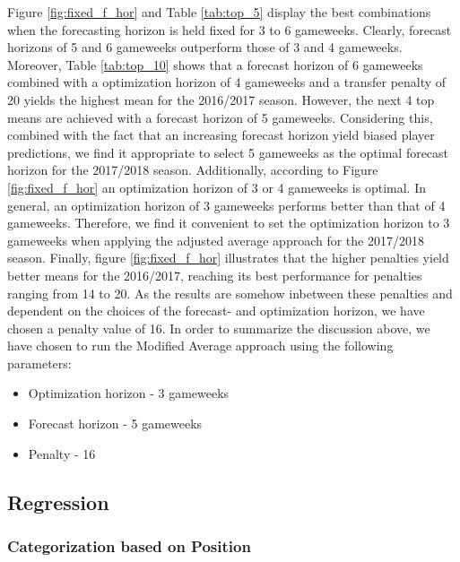 Figure \ref{fig:fixed_f_hor} and Table \ref{tab:top_5} display the best combinations when the forecasting horizon is held fixed for 3 to 6 gameweeks. Clearly, forecast horizons of 5 and 6 gameweeks outperform those of 3 and 4 gameweeks. Moreover, Table \ref{tab:top_10} shows that a forecast horizon of 6 gameweeks combined with a optimization horizon of 4 gameweeks and a transfer penalty of 20 yields the highest mean for the 2016/2017 season. However, the next 4 top means are achieved with a forecast horizon of 5 gameweeks. Considering this, combined with the fact that an increasing forecast horizon yield biased player predictions, we find it appropriate to select 5 gameweeks as the optimal forecast horizon for the 2017/2018 season. Additionally, according to Figure \ref{fig:fixed_f_hor} an optimization horizon of 3 or 4 gameweeks is optimal. In general, an optimization horizon of 3 gameweeks performs better than that of 4 gameweeks. Therefore, we find it convenient to set the optimization horizon to 3 gameweeks when applying the adjusted average approach for the 2017/2018 season.
Finally, figure \ref{fig:fixed_f_hor} illustrates that the higher penalties yield better means for the 2016/2017, reaching its best performance for penalties ranging from 14 to 20. 
\newpar
As the results are somehow inbetween these penalties and dependent on the choices of the forecast- and optimization horizon, we have chosen a penalty value of 16. 
\newpar
In order to summarize the discussion above, we have chosen to run the Modified Average approach using the following parameters:
\begin{itemize}
    \item Optimization horizon - 3 gameweeks
    \item Forecast horizon - 5 gameweeks
    \item Penalty - 16
\end{itemize}

\subsection{Regression}\label{exp_setup_reg}

\subsubsection{Categorization based on Position}

